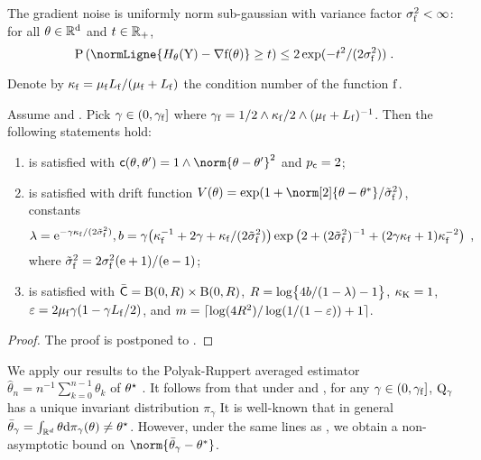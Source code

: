 \begin{assumptionSGD}
\label{ass:sgd_noise_exp_mom}
The gradient noise is uniformly norm sub-gaussian with variance factor $\sigma_{\mathrm{f}}^2 < \infty$: for all $\theta \in \mathbb{R}^{\mathrm{d}}$
 and $t \in \mathbb{R}_+$,
\[
\PP\left( \normLigne{\fieldH_{\theta}(\YSGD) - \nabla \objf(\theta)} \geq t \right) \leq  2 \exp(-t^2 /(2 \sgvarfac)) \eqsp.
\]
\end{assumptionSGD}
Denote by $\kappa_{\mathrm{f}}= \mu_{\mathrm{f}} L_{\mathrm{f}}/ (\mu_{\mathrm{f}}+L_{\mathrm{f}})$ the condition number of the function $\mathrm{f}$.
\begin{proposition}
\label{theo:SGD}
Assume  and . Pick $\gamma \in \left(0,\gamma_{\mathrm{f}}\right]$ where $\gamma_{\mathrm{f}}= 1/2 \wedge \kappa_{\mathrm{f}}/2 \wedge (\mu_{\mathrm{f}}+L_{\mathrm{f}})^{-1}$. Then the following statements hold:
\begin{enumerate}
\item \label{item:theo:SGD-1}  is satisfied with $\cost(\theta,\theta') = 1 \wedge \norm{\theta-\theta'}^2$ and $p_{\mathsf{c}}=2$;
\item \label{item:theo:SGD-2}  is satisfied with drift function $V(\theta)= \exp(1 + \norm[2]{\theta-\theta^*}/\tsgvarfac)$, constants
\begin{equation*}
\lambda = \mathrm{e}^{-\gamma\kappa_{\mathrm{f}}/(2\tilde{\sigma}_{\mathrm{f}}^2)}, b = \gamma\bigl(\kappa_{\mathrm{f}}^{-1} + 2 \gamma + \kappa_{\mathrm{f}}/(2\tilde{\sigma}_{\mathrm{f}}^2)\bigr)\exp\left(2 + (2\tilde{\sigma}_{\mathrm{f}}^2)^{-1} + (2\gamma \kappa_{\mathrm{f}}+1)\kappa_{\mathrm{f}}^{-2}\right)\;,
\end{equation*}
where $\tilde{\sigma}_{\mathrm{f}}^2 = 2\sigma_{\mathrm{f}}^2(\mathrm{e}+1)/(\mathrm{e}-1)$;
\item \label{item:theo:SGD-3}  is satisfied with $\bar{\mathsf{C}}= \operatorname{B}(0,R) \times \operatorname{B}(0,R)$, $R = \log\bigl\{4b/(1-\lambda) - 1 \bigr\}$, $\kappa_{{\rm K}}= 1$, $\varepsilon= 2\mu_{\mathrm{f}} \gamma (1-\gamma L_{\mathrm{f}}/2)$, and $m = \lceil \log(4R^2)/\log(1/(1-\varepsilon)) + 1 \rceil$.
\end{enumerate}
\end{proposition}
\begin{proof}
The proof is postponed to .
\end{proof}
We apply our results to the Polyak-Ruppert averaged estimator $\hat{\theta}_n = n^{-1} \sum_{k=0}^{n-1} \theta_k$ of $\theta^{\star}$  \cite{ruppert1988efficient,polyak1992acceleration}.
It follows from  that under  and , for any $\gamma \in \left(0,\gamma_{\mathrm{f}}\right]$, ${\rm Q}_{\gamma}$ has a unique invariant distribution $\pi_\gamma$
It is well-known that in general $\bar{\theta}_{\gamma} = \int_{\mathbb{R}^d} \theta \mathrm{d} \pi_{\gamma}(\theta) \neq  \theta^{\star}$. However, under the same lines as \cite[Theorem~4]{dieuleveut2020bridging}, we obtain a non-asymptotic bound on  $\norm{\bar{\theta}_{\gamma}- \theta^*}$.

